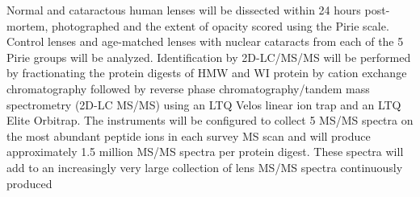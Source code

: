 \documentclass[arial,11pt]{article}
\begin{document}
Normal and cataractous human lenses will
be dissected within 24 hours post-mortem, photographed and the extent of opacity scored using the Pirie scale.
Control lenses and age-matched lenses with nuclear cataracts from each of the 5 Pirie groups will be analyzed.
%
Identification by 2D-LC/MS/MS will be performed by fractionating the protein digests of HMW and WI protein by cation exchange chromatography followed by reverse phase chromatography/tandem mass spectrometry (2D-LC MS/MS) using an LTQ Velos linear ion trap and an LTQ Elite Orbitrap.  The instruments will be configured to collect 5 MS/MS spectra on the most abundant peptide ions in each survey MS scan and will produce approximately 1.5 million MS/MS spectra per protein digest. These spectra will add to an increasingly very large collection of lens MS/MS spectra continuously produced 
\end{document}
